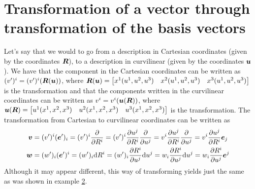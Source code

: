 \documentclass[a4paper, 12pt]{article}
\begin{document}
\section{Transformation of a vector through transformation of the basis vectors}
Let's say that we would to go from a description in Cartesian coordinates
(given by the coordinates $\boldsymbol{R}$), to a description in curvilinear (given by
the coordinates $\boldsymbol{u}$). We have that the component in the Cartesian
coordinates can be written as $(v')^i =
(v')^i(\boldsymbol{R}(\boldsymbol{u}))$, where
$\boldsymbol{R}(\boldsymbol{u}) =
 \begin{bmatrix}
  x^1(u^1,u^2,u^3)&
  x^2(u^1,u^2,u^3)&
  x^3(u^1,u^2,u^3)
 \end{bmatrix}
$
is the transformation and that the components written in the curvilinear
coordinates can be written
as
$v^i =
v^i(\boldsymbol{u}(\boldsymbol{R}))$, where
$\boldsymbol{u}(\boldsymbol{R}) =
 \begin{bmatrix}
  u^1(x^1,x^2,x^3)&
  u^2(x^1,x^2,x^3)&
  u^3(x^1,x^2,x^3)
 \end{bmatrix}
$ is the transformation. The transformation from Cartesian to curvilinear
coordinates can be written as
%
\begin{align*}
 \boldsymbol{v} &=
 (v')^i(\boldsymbol{e}')_i =
 (v')^i\frac{\partial {}}{\partial{R^i}} =
 (v')^i \frac{\partial {u^j}}{\partial{R^i}}\frac{\partial {}}{\partial{u^j}} =
 v^i \frac{\partial {u^j}}{\partial{R^i}}\frac{\partial {}}{\partial{u^j}} =
 v^i \frac{\partial {u^j}}{\partial{R^i}}\boldsymbol{e}_j
 \\
 \boldsymbol{w} &=
 (w')_i(\boldsymbol{e}')^i =
 (w')_i\text{d}R^i =
 (w')_i \frac{\partial {R^i}}{\partial{u^j}}\text{d}u^j =
 w_i \frac{\partial {R^i}}{\partial{u^j}}\text{d}u^j =
 w_i \frac{\partial {R^i}}{\partial{u^j}}\boldsymbol{e}^j
\end{align*}
%
Although it may appear different, this way of transforming yields just the same
as was shown in example \hyperref[ex:vft]{2}.


\nocite{diverno_1992}
\nocite{arfken_2012}
\nocite{DHaeseleer_1991}
\nocite{wiki_co_cont}
\nocite{wiki_co_trans}
\nocite{diverno_url}
\nocite{physics_forum}
\nocite{wiki_cot_space}
\nocite{mathworld_pseudo}
\nocite{wiki_curvilinear}



\end{document}
